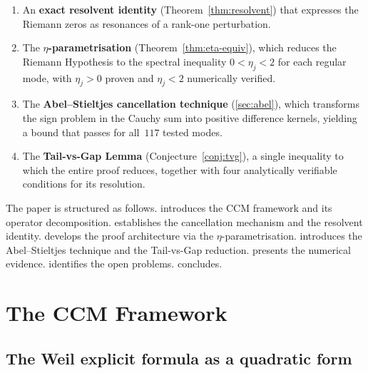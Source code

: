 \documentclass[12pt,a4paper]{article}
\theoremstyle{definition}
\theoremstyle{remark}
\begin{document}
\begin{enumerate}[label=(\roman*)]
\item An \textbf{exact resolvent identity} (Theorem~\ref{thm:resolvent})
  that expresses the Riemann zeros as resonances of a rank-one perturbation.
\item The \textbf{$\eta$-parametrisation} (Theorem~\ref{thm:eta-equiv}),
  which reduces the Riemann Hypothesis to the spectral inequality
  $0 < \eta_j < 2$ for each regular mode, with $\eta_j > 0$ proven
  and $\eta_j < 2$ numerically verified.
\item The \textbf{Abel--Stieltjes cancellation technique}
  (\cref{sec:abel}), which transforms the sign problem in the Cauchy
  sum into positive difference kernels, yielding a bound that passes
  for all~$117$ tested modes.
\item The \textbf{Tail-vs-Gap Lemma} (Conjecture~\ref{conj:tvg}),
  a single inequality to which the entire proof reduces, together
  with four analytically verifiable conditions for its resolution.
\end{enumerate}

The paper is structured as follows.
 introduces the CCM framework and its operator
decomposition.
 establishes the cancellation mechanism and the
resolvent identity.
 develops the proof architecture via the
$\eta$-parametrisation.
 introduces the Abel--Stieltjes technique and the
Tail-vs-Gap reduction.
 presents the numerical evidence.
 identifies the open problems.
 concludes.

\section{The CCM Framework}
\label{sec:framework}

\subsection{The Weil explicit formula as a quadratic form}
\end{document}
